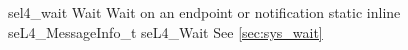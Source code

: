 %
%
%
%

\apidoc
{sel4_wait}
{Wait}
{Wait on an endpoint or notification}
{static inline seL4\_MessageInfo\_t seL4\_Wait}
{
}
{\messageinforetdesc}
{See \autoref{sec:sys_wait}}
